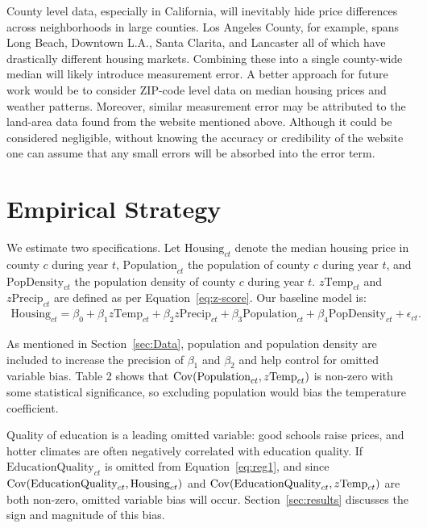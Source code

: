 \documentclass[12pt,reqno]{amsart}
\theoremstyle{definition}
\begin{document}
    County level data, especially in California, will inevitably hide price differences across neighborhoods in large counties. Los Angeles County, for example, spans Long Beach, Downtown L.A., Santa Clarita, and Lancaster \textemdash all of which have drastically different housing markets. Combining these into a single county-wide median will likely introduce measurement error. A better approach for future work would be to consider ZIP-code level data on median housing prices and weather patterns. Moreover, similar measurement error may be attributed to the land-area data found from the website mentioned above. Although it could be considered negligible, without knowing the accuracy or credibility of the website one can assume that any small errors will be absorbed into the error term. 

\section{Empirical Strategy}\label{sec:emp-strat}

    We estimate two specifications. Let $\text{Housing}_{ct}$ denote the median housing price in county $c$ during year $t$, $\text{Population}_{ct}$ the population of county $c$ during year $t$, and $\text{PopDensity}_{ct}$ the population density of county $c$ during year $t$. $z\text{Temp}_{ct}$ and $z\text{Precip}_{ct}$ are defined as per Equation~\ref{eq:z-score}. Our baseline model is:
        \begin{equation}\label{eq:reg1}
        \begin{split}
            \text{Housing}_{ct} = \beta_0 + \beta_1 z\text{Temp}_{ct} + \beta_2 z\text{Precip}_{ct} + \beta_3 \text{Population}_{ct} + \beta_4 \text{PopDensity}_{ct} + \epsilon_{ct}.
        \end{split}
        \end{equation}

    As mentioned in Section~\ref{sec:Data}, population and population density are included to increase the precision of $\beta_1$ and $\beta_2$ and help control for omitted variable bias. Table 2 shows that $\operatorname{Cov}(\text{Population}_{ct},z\text{Temp}_{ct})$ is non-zero with some statistical significance, so excluding population would bias the temperature coefficient.

    

    Quality of education is a leading omitted variable: good schools raise prices, and hotter climates are often negatively correlated with education quality. If $\text{EducationQuality}_{ct}$ is omitted from Equation~\ref{eq:reg1}, and since $\operatorname{Cov}(\text{EducationQuality}_{ct}, \text{Housing}_{ct}) $ and \newline $\operatorname{Cov}(\text{EducationQuality}_{ct}, z\text{Temp}_{ct})$ are both non-zero, omitted variable bias will occur. Section~\ref{sec:results} discusses the sign and magnitude of this bias.
\end{document}

